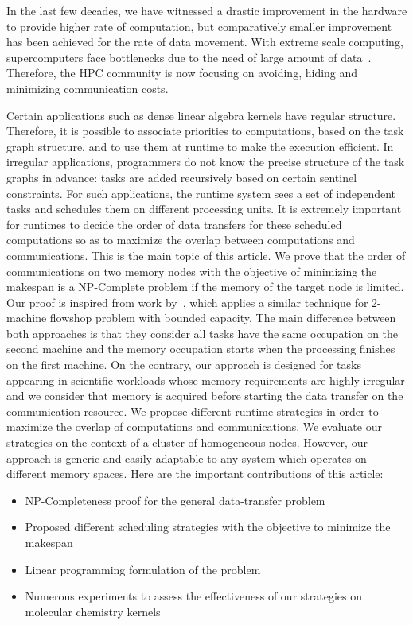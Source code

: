\documentclass[runningheads]{llncs} %
\begin{document}
In the last few decades, we have witnessed a drastic improvement in the hardware to provide higher rate of computation, but comparatively smaller improvement has been achieved for the rate of data movement. With extreme scale computing, supercomputers face bottlenecks due to the need of large amount of data~\cite{ascaccommitteereport2014,yelick2016}. Therefore, the HPC community is now focusing on avoiding, hiding and minimizing communication costs.


Certain applications such as dense linear algebra kernels have regular structure. Therefore, it is possible to associate priorities to computations, based on the task graph structure, and to use them at runtime to make the execution efficient. In irregular applications, programmers do not know the precise structure of the task graphs in advance: tasks are added recursively based on certain sentinel constraints. For such applications, the runtime system sees a set of independent tasks and schedules them on different processing units. It is extremely important for runtimes to decide the order of data transfers for these scheduled computations so as to maximize the overlap between computations and communications. This is the main topic of this article. We prove that the order of communications on two memory nodes with the objective of minimizing the makespan is a NP-Complete problem if the memory of the target node is limited. Our proof is inspired from work by~\cite{Papadimitriou:1980:FSL:322203.322213}, which applies a similar technique for 2-machine flowshop problem with bounded capacity. The main difference between both approaches is that they consider all tasks have the same occupation on the second machine and the memory occupation starts when the processing finishes on the first machine. On the contrary, our approach is designed for tasks appearing in scientific workloads whose memory requirements are highly irregular and we consider that memory is acquired before starting the data transfer on the communication resource. We propose different runtime strategies in order to maximize the overlap of computations and communications. We evaluate our strategies on the context of a cluster of homogeneous nodes. However, our approach is generic and easily adaptable to any system which operates on different memory spaces. Here are the important contributions of this article:


\renewcommand{\labelitemi}{$\bullet$}
\begin{itemize}
	\item NP-Completeness proof for the general data-transfer problem 
	\item Proposed different scheduling strategies with the objective to minimize the makespan
	\item Linear programming formulation of the problem
	\item Numerous experiments to assess the effectiveness of our strategies on molecular chemistry kernels 
\end{itemize}
\end{document}
